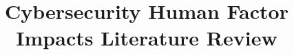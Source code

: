 \documentclass{article}
\begin{document}
\title{Cybersecurity Human Factor Impacts Literature Review} \nocite{*}
\maketitle

\printbibliography
\end{document}
